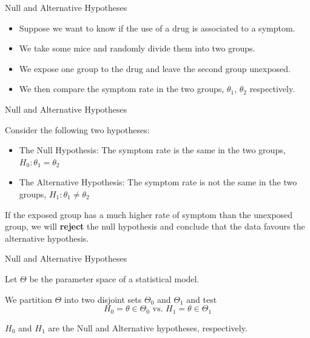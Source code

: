 \documentclass{beamer}
\begin{document}
\begin{frame}{Null and Alternative Hypotheses}

	\begin{itemize}
	\item Suppose we want to know if the use of a drug is associated to a symptom. 

	\item We take some mice and randomly divide them into two groups.

	\item We expose one group to the drug and leave the second group unexposed.

	\item We then compare the symptom rate in the two groups, $\theta_1$, $\theta_2$ respectively.
	\end{itemize}

\end{frame}

\begin{frame}{Null and Alternative Hypotheses}

	Consider the following two hypotheses:
	\begin{itemize}
		\item The Null Hypothesis: The symptom rate is the same in the two groups, $H_0:\theta_1 = \theta_2$
		\item The Alternative Hypothesis: The symptom rate is not the same in the two groups, $H_1:\theta_1 \neq \theta_2$
	\end{itemize}

	\vskip 0.5cm

	If the exposed group has a much higher rate of symptom than the
	unexposed group, we will \textbf{reject} the null hypothesis and conclude that
	the data favours the alternative hypothesis.

\end{frame}

\begin{frame}{Null and Alternative Hypotheses}

	Let $\Theta$ be the parameter space of a statistical model. 

	We partition $\Theta$ into two disjoint  sets $\Theta_0$ and $\Theta_1$ and test
	\begin{equation*}
		H_0 = \theta \in \Theta_0 \text{ vs. } H_1 = \theta \in \Theta_1 
	\end{equation*}

	$H_0$ and $H_1$ are the Null and Alternative hypotheses, respectively.

\end{frame}
\end{document}
